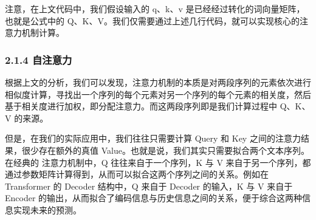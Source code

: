 \documentclass[12pt,a4paper]{book}
\begin{document}
\begin{Shaded}
\begin{Highlighting}[]
\OperatorTok{=}\NormalTok{):}
    \CommentTok{\textquotesingle{}\textquotesingle{}\textquotesingle{}}
\CommentTok{    \textquotesingle{}\textquotesingle{}\textquotesingle{}}
\OperatorTok{=}\OperatorTok{{-}}\NormalTok{) }
\OperatorTok{=}\OperatorTok{{-}}\NormalTok{, }\OperatorTok{{-}}\NormalTok{)) }\OperatorTok{/}
\OperatorTok{=}\OperatorTok{={-}}\NormalTok{)}
      \NormalTok{:}
\OperatorTok{=}
\end{Highlighting}
\end{Shaded}

注意，在上文代码中，我们假设输入的 q、k、v
是已经经过转化的词向量矩阵，也就是公式中的
Q、K、V。我们仅需要通过上述几行代码，就可以实现核心的注意力机制计算。

\subsubsection{2.1.4 自注意力}\label{ux81eaux6ce8ux610fux529b}

根据上文的分析，我们可以发现，注意力机制的本质是对两段序列的元素依次进行相似度计算，寻找出一个序列的每个元素对另一个序列的每个元素的相关度，然后基于相关度进行加权，即分配注意力。而这两段序列即是我们计算过程中
Q、K、V 的来源。

但是，在我们的实际应用中，我们往往只需要计算 Query 和 Key
之间的注意力结果，很少存在额外的真值
Value。也就是说，我们其实只需要拟合两个文本序列。\hspace{0pt}在经典的
注意力机制中，Q 往往来自于一个序列，K 与 V
来自于另一个序列，都通过参数矩阵计算得到，从而可以拟合这两个序列之间的关系。例如在
Transformer 的 Decoder 结构中，Q 来自于 Decoder 的输入，K 与 V 来自于
Encoder
的输出，从而拟合了编码信息与历史信息之间的关系，便于综合这两种信息实现未来的预测。
\end{document}
